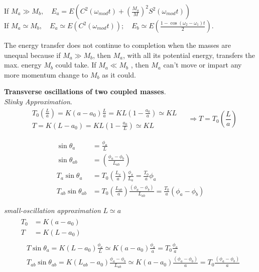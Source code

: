 \documentclass[twoside,10pt]{amsart}
\newcommand{\problemhead}[1]
  {\smallskip
   \noindent{\large\bf Problem #1.}
   \smallskip}
\begin{document}
If $M_a \gg M_b, \quad E_a  = E(C^2(\omega_{mod} t ) + \left( \frac{M_a}{M} \right)^2 S^2(\omega_{mod} t ) ) $ \\
If $M_a \simeq M_b, \quad E_a \simeq E(C^2(\omega_{mod} t ) ); \quad E_b \simeq E \left( \frac{1 - \cos{ (\omega_2 - \omega_1 )t } }{ 2 } \right) $.  

The energy transfer does not continue to completion when the masses are unequal because if $M_a \gg M_b$, then $M_a$, with all its potential energy, transfers the max. energy $M_b$ could take.  If $M_a \ll M_b$ , then $M_a$ can't move or impart any more momentum change to $M_b$ as it could. 

\problemhead{1.20} \textbf{ Transverse oscillations of two coupled masses}.  \\
\emph{ Slinky Approximation}.  
\[
\begin{aligned}
  & T_0 \left( \frac{L}{a} \right) = K(a- a_0) \frac{L}{a} = KL (1 - \frac{a_0}{a} ) \simeq KL \\
  & T = K(L-a_0) = KL(1 - \frac{a_0}{L} ) \simeq KL 
\end{aligned} \quad \, 
\Longrightarrow T = T_0 \left( \frac{L}{a} \right) 
\]

\[
\begin{aligned}
  \sin{\theta_a} & = \frac{ \phi_a}{L} \\
  \sin{\theta_{ab}} & = \left( \frac{ \phi_a - \phi_b}{ L_{ab}} \right) \\
  T_a \sin{ \theta_a} & = T_0 \left( \frac{L_a}{a} \right) \frac{ \phi_a }{ L_a } = \frac{T_0}{a} \phi_a \\
  T_{ab} \sin{ \theta_{ab}} & = T_0 \left( \frac{ L_{ab}}{a} \right) \frac{ (\phi_a - \phi_b) }{ L_{ab}} = \frac{T_0}{a} (\phi_a - \phi_b) 
\end{aligned}
\]

\emph{small-oscillation approximation} $L \simeq a$
\[
\begin{gathered}
  \begin{aligned}
    T_0 & = K (a-a_0) \\
    T & = K(L-a_0) 
  \end{aligned} \\
  \begin{aligned}
    & T \sin{ \theta_a} = K(L-a_0) \frac{\phi_a}{L} \simeq K(a-a_0) \frac{\phi_a}{a} = T_0 \frac{ \phi_a}{a} \\
    & T_{ab} \sin{\theta_{ab}} = K(L_{ab} - a_0) \frac{ \phi_a - \phi_b}{L_{ab}} \simeq K (a-a_0)\frac{ (\phi_a - \phi_b)}{a} = T_0 \frac{ (\phi_a - \phi_b) }{ a } 
  \end{aligned}
\end{gathered}
\]
\end{document}
